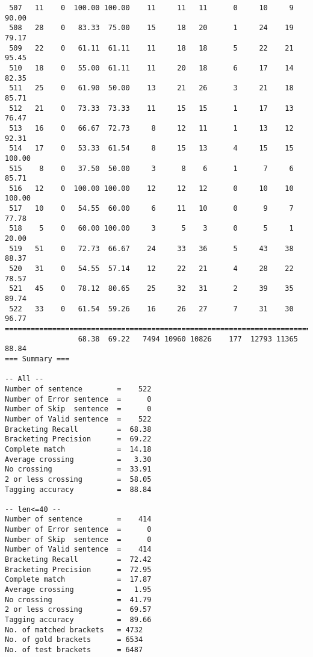 \begin{verbatim}
 507   11    0  100.00 100.00    11     11   11      0     10     9    90.00
 508   28    0   83.33  75.00    15     18   20      1     24    19    79.17
 509   22    0   61.11  61.11    11     18   18      5     22    21    95.45
 510   18    0   55.00  61.11    11     20   18      6     17    14    82.35
 511   25    0   61.90  50.00    13     21   26      3     21    18    85.71
 512   21    0   73.33  73.33    11     15   15      1     17    13    76.47
 513   16    0   66.67  72.73     8     12   11      1     13    12    92.31
 514   17    0   53.33  61.54     8     15   13      4     15    15   100.00
 515    8    0   37.50  50.00     3      8    6      1      7     6    85.71
 516   12    0  100.00 100.00    12     12   12      0     10    10   100.00
 517   10    0   54.55  60.00     6     11   10      0      9     7    77.78
 518    5    0   60.00 100.00     3      5    3      0      5     1    20.00
 519   51    0   72.73  66.67    24     33   36      5     43    38    88.37
 520   31    0   54.55  57.14    12     22   21      4     28    22    78.57
 521   45    0   78.12  80.65    25     32   31      2     39    35    89.74
 522   33    0   61.54  59.26    16     26   27      7     31    30    96.77
============================================================================
                 68.38  69.22   7494 10960 10826    177  12793 11365    88.84
=== Summary ===

-- All --
Number of sentence        =    522
Number of Error sentence  =      0
Number of Skip  sentence  =      0
Number of Valid sentence  =    522
Bracketing Recall         =  68.38
Bracketing Precision      =  69.22
Complete match            =  14.18
Average crossing          =   3.30
No crossing               =  33.91
2 or less crossing        =  58.05
Tagging accuracy          =  88.84

-- len<=40 --
Number of sentence        =    414
Number of Error sentence  =      0
Number of Skip  sentence  =      0
Number of Valid sentence  =    414
Bracketing Recall         =  72.42
Bracketing Precision      =  72.95
Complete match            =  17.87
Average crossing          =   1.95
No crossing               =  41.79
2 or less crossing        =  69.57
Tagging accuracy          =  89.66
No. of matched brackets   = 4732
No. of gold brackets      = 6534
No. of test brackets      = 6487

\end{verbatim}

\normalsize


